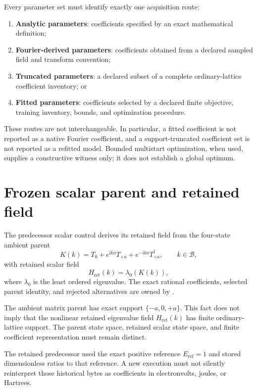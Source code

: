 \documentclass[11pt]{article}
\newcommand{\BZ}{\mathcal{B}}
\newcommand{\ii}{\mathrm{i}}
\newcommand{\Hret}{H_{\mathrm{ret}}}
\begin{document}
Every parameter set must identify exactly one acquisition route:
\begin{enumerate}[leftmargin=*]
  \item \textbf{Analytic parameters}: coefficients specified by an exact mathematical
    definition;
  \item \textbf{Fourier-derived parameters}: coefficients obtained from a declared
    sampled field and transform convention;
  \item \textbf{Truncated parameters}: a declared subset of a complete ordinary-lattice
    coefficient inventory; or
  \item \textbf{Fitted parameters}: coefficients selected by a declared finite
    objective, training inventory, bounds, and optimization procedure.
\end{enumerate}

These routes are not interchangeable.  In particular, a fitted coefficient is not
reported as a native Fourier coefficient, and a support-truncated coefficient set is not
reported as a refitted model.  Bounded multistart optimization, when used, supplies a
constructive witness only; it does not establish a global optimum.

\section{Frozen scalar parent and retained field}

The predecessor scalar control derives its retained field from the four-state ambient
parent
\begin{equation}
  K(k)=T_0+e^{\ii ka}T_{+a}+e^{-\ii ka}T_{+a}^{\dagger},
  \qquad k\in\BZ,
\end{equation}
with retained scalar field
\begin{equation}
  \Hret(k)=\lambda_0\!\left(K(k)\right),
\end{equation}
where $\lambda_0$ is the least ordered eigenvalue.  The exact rational coefficients,
selected parent identity, and rejected alternatives are owned by
.

The ambient matrix parent has exact support $\{-a,0,+a\}$.  This fact does not imply that
the nonlinear retained eigenvalue field $\Hret(k)$ has finite ordinary-lattice support.
The parent state space, retained scalar state space, and finite coefficient
representation must remain distinct.

The retained predecessor used the exact positive reference $E_{\mathrm{ref}}=1$ and
stored dimensionless ratios to that reference.  A new execution must not silently
reinterpret those historical bytes as coefficients in electronvolts, joules, or
Hartrees.
\end{document}
